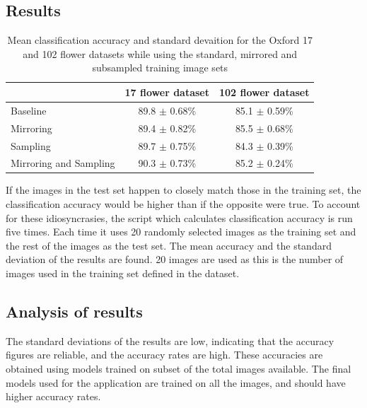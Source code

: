 \documentclass[11pt, a4paper]{report}
\begin{document}
\subsection{Results}

\begin{table}[h]
\centering 
\renewcommand{\arraystretch}{1.3}
\begin{tabular}{l|cc}
  & {\bf 17 flower dataset} & {\bf 102 flower dataset} \\
  \hline
  Baseline & 89.8 $\pm$ 0.68\% & 85.1 $\pm$ 0.59\% \\
  Mirroring & 89.4 $\pm$ 0.82\% & 85.5 $\pm$ 0.68\% \\
  Sampling & 89.7 $\pm$ 0.75\% & 84.3 $\pm$ 0.39\% \\
  Mirroring and Sampling & 90.3 $\pm$ 0.73\% & 85.2 $\pm$ 0.24\% 
\end{tabular}
\renewcommand{\arraystretch}{1}
\caption{Mean classification accuracy and standard devaition for the Oxford 17 and 102 flower datasets while using the standard, mirrored and subsampled training image sets}
\label{table:accuracy}
\end{table}

If the images in the test set happen to closely match those in the training set, the classification accuracy would be higher than if the opposite were true. To account for these idiosyncrasies, the script which calculates classification accuracy is run five times. Each time it uses 20 randomly selected images as the training set and the rest of the images as the test set. The mean accuracy and the standard deviation of the results are found. 20 images are used as this is the number of images used in the training set defined in the dataset. 

\subsection{Analysis of results}
%
%
%

The standard deviations of the results are low, indicating that the accuracy figures are reliable, and the accuracy rates are high. These accuracies are obtained using models trained on subset of the total images available. The final models used for the application are trained on all the images, and should have higher accuracy rates.
\end{document}
